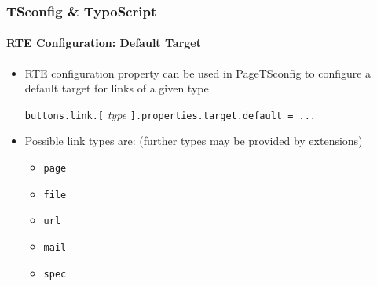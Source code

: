 \begin{frame}[fragile]
	\frametitle{TSconfig \& TypoScript}
	\framesubtitle{RTE Configuration: Default Target}

	\begin{itemize}

		\item RTE configuration property can be used in PageTSconfig to configure a default
			target for links of a given type\newline

			\small
				\texttt{buttons.link.[}
				\textit{type}
				\texttt{].properties.target.default = ...}
			\normalsize\newline

		\item Possible link types are:\newline
			\small
				(further types may be provided by extensions)
			\normalsize

			\begin{itemize}
				\item \texttt{page}
				\item \texttt{file}
				\item \texttt{url}
				\item \texttt{mail}
				\item \texttt{spec}
			\end{itemize}
	\end{itemize}

\end{frame}

